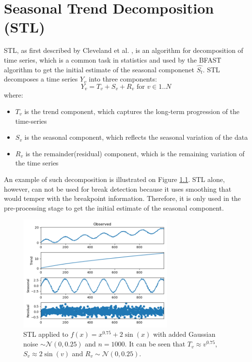 \documentclass[main.tex]{subfiles}
\begin{document}
\chapter{Seasonal Trend Decomposition (STL)}
\label{chap:stl}
STL, as first described by Cleveland et al. \cite{stl}, is an
algorithm for decomposition of time series, which is a common task in
statistics and used by the BFAST algorithm to get the initial estimate of the
seasonal componenet $\hat{S_t}$.
STL decomposes a time series $Y_v$ into three components:
\[
Y_v = T_v + S_v + R_v \text{ for } v \in 1..N
\]
where:
\begin{itemize}
\item $T_v$ is the trend component, which captures the long-term progression of
  the time-series
\item $S_v$ is the seasonal component, which reflects the seasonal variation of
  the data
\item $R_v$ is the remainder(residual) component, which is the remaining variation of the time series
\end{itemize}
An example of such decomposition is illustrated on Figure \ref{fig_stl}.
STL alone, however, can not be used for break detection because it uses smoothing
that would temper with the breakpoint information. Therefore, it is only used in
the pre-processing stage to get the initial estimate of the seasonal component.
\begin{figure}
  \centering
  \includegraphics[width=0.7\textwidth]{imgs/stl1}
  \caption{STL applied to $f(x) = x^{0.75} + 2\sin(x)$ with added Gaussian noise
    $\sim \mathcal{N}(0, 0.25)$ and $n = 1000$. It can be seen that
    $T_v \approx v^{0.75}$, $S_v \approx 2\sin(v)$ and $R_v \sim \mathcal{N}(0, 0.25)$. }
  \label{fig_stl}
\end{figure}
\end{document}
